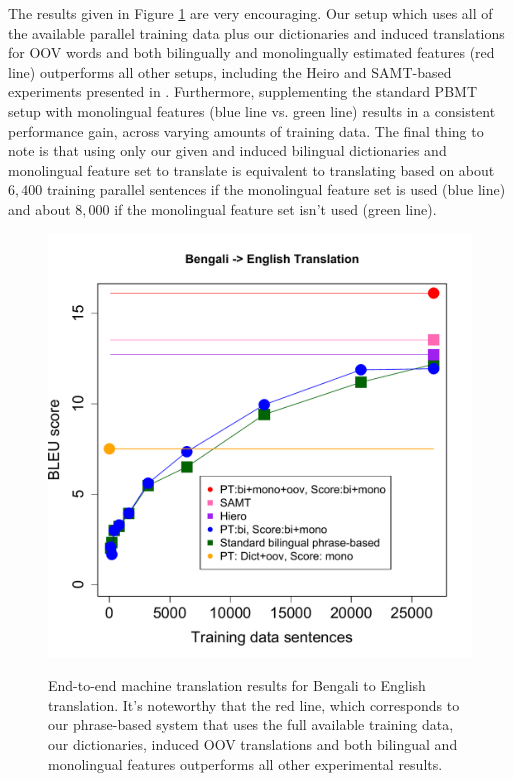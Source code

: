 \documentclass[11pt]{article}
\begin{document}
The results given in Figure \ref{fig:bntrans} are very encouraging. Our setup which uses all of the available parallel training data plus our dictionaries and induced translations for OOV words and both bilingually and monolingually estimated features (red line) outperforms all other setups, including the Heiro and SAMT-based experiments presented in . Furthermore, supplementing the standard PBMT setup with monolingual features (blue line vs. green line) results in a consistent performance gain, across varying amounts of training data. The final thing to note is that using only our given and induced bilingual dictionaries and monolingual feature set to translate is equivalent to translating based on about $6,400$ training parallel sentences if the monolingual feature set is used (blue line) and about $8,000$ if the monolingual feature set isn't used (green line).

\begin{figure}
\vskip 0.0in
\begin{center}
\includegraphics[width=1.05 \linewidth]{Figures/bntranslate.pdf}
\vskip -0.15in
\caption{End-to-end machine translation results for Bengali to English translation. It's noteworthy that the red line, which corresponds to our phrase-based system that uses the full available training data, our dictionaries, induced OOV translations and both bilingual and monolingual features outperforms all other experimental results.}
\vskip -0.2in
\label{fig:bntrans} 
\end{center}
\end{figure}
\end{document}
